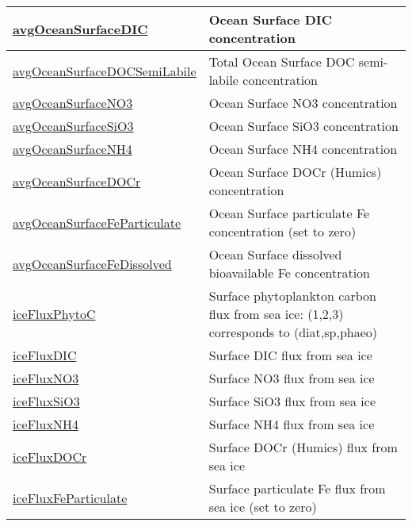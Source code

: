 {\begin{center}
\begin{longtable}{| p{2.0in} | p{4.0in} |}
    \hline
    \hyperref[subsec:var_sec_forcing_avgOceanSurfaceDIC]{avgOceanSurfaceDIC} & Ocean Surface DIC concentration \\
    \hline
    \hyperref[subsec:var_sec_forcing_avgOceanSurfaceDOCSemiLabile]{avgOceanSurfaceDOCSemiLabile} & Total Ocean Surface DOC semi-labile concentration \\
    \hline
    \hyperref[subsec:var_sec_forcing_avgOceanSurfaceNO3]{avgOceanSurfaceNO3} & Ocean Surface NO3 concentration \\
    \hline
    \hyperref[subsec:var_sec_forcing_avgOceanSurfaceSiO3]{avgOceanSurfaceSiO3} & Ocean Surface SiO3 concentration \\
    \hline
    \hyperref[subsec:var_sec_forcing_avgOceanSurfaceNH4]{avgOceanSurfaceNH4} & Ocean Surface NH4 concentration \\
    \hline
    \hyperref[subsec:var_sec_forcing_avgOceanSurfaceDOCr]{avgOceanSurfaceDOCr} & Ocean Surface DOCr (Humics) concentration \\
    \hline
    \hyperref[subsec:var_sec_forcing_avgOceanSurfaceFeParticulate]{avgOceanSurfaceFeParticulate} & Ocean Surface particulate Fe concentration (set to zero) \\
    \hline
    \hyperref[subsec:var_sec_forcing_avgOceanSurfaceFeDissolved]{avgOceanSurfaceFeDissolved} & Ocean Surface dissolved bioavailable Fe concentration \\
    \hline
    \hyperref[subsec:var_sec_forcing_iceFluxPhytoC]{iceFluxPhytoC} & Surface phytoplankton carbon flux from sea ice: (1,2,3) corresponds to (diat,sp,phaeo) \\
    \hline
    \hyperref[subsec:var_sec_forcing_iceFluxDIC]{iceFluxDIC} & Surface DIC flux from sea ice \\
    \hline
    \hyperref[subsec:var_sec_forcing_iceFluxNO3]{iceFluxNO3} & Surface NO3 flux from sea ice \\
    \hline
    \hyperref[subsec:var_sec_forcing_iceFluxSiO3]{iceFluxSiO3} & Surface SiO3 flux from sea ice \\
    \hline
    \hyperref[subsec:var_sec_forcing_iceFluxNH4]{iceFluxNH4} & Surface NH4 flux from sea ice \\
    \hline
    \hyperref[subsec:var_sec_forcing_iceFluxDOCr]{iceFluxDOCr} & Surface DOCr (Humics) flux from sea ice \\
    \hline
    \hyperref[subsec:var_sec_forcing_iceFluxFeParticulate]{iceFluxFeParticulate} & Surface particulate Fe flux from sea ice (set to zero) \\

\end{longtable}
\end{center}}
